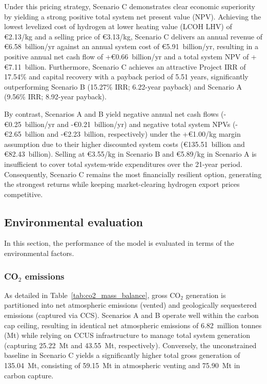 \documentclass[preprint,12pt]{elsarticle}
\begin{document}
Under this pricing strategy, Scenario C demonstrates clear economic superiority by yielding a strong positive total system net present value (NPV). Achieving the lowest levelized cost of hydrogen at lower heating value (LCOH LHV) of €2.13/kg and a selling price of €3.13/kg, Scenario C delivers an annual revenue of €6.58~billion/yr against an annual system cost of €5.91~billion/yr, resulting in a positive annual net cash flow of +€0.66~billion/yr and a total system NPV of +€7.11~billion. Furthermore, Scenario C achieves an attractive Project IRR of 17.54\% and capital recovery with a payback period of 5.51 years, significantly outperforming Scenario B (15.27\% IRR; 6.22-year payback) and Scenario A (9.56\% IRR; 8.92-year payback).

By contrast, Scenarios A and B yield negative annual net cash flows (-€0.25~billion/yr and -€0.21~billion/yr) and negative total system NPVs (-€2.65~billion and -€2.23~billion, respectively) under the +€1.00/kg margin assumption due to their higher discounted system costs (€135.51~billion and €82.43~billion). Selling at €3.55/kg in Scenario B and €5.89/kg in Scenario A is insufficient to cover total system-wide expenditures over the 21-year period. Consequently, Scenario C remains the most financially resilient option, generating the strongest returns while keeping market-clearing hydrogen export prices competitive.


\subsection{Environmental evaluation}
In this section, the performance of the model is evaluated in terms of the environmental factors.

\subsubsection{CO$_2$ emissions}
\label{sec:co2_emis}
As detailed in Table~\ref{tab:co2_mass_balance}, gross $\text{CO}_2$ generation is partitioned into net atmospheric emissions (vented) and geologically sequestered emissions (captured via CCS). Scenarios A and B operate well within the carbon cap ceiling, resulting in identical net atmospheric emissions of 6.82~million tonnes (Mt) while relying on CCUS infrastructure to manage total system generation (capturing 25.22~Mt and 43.55~Mt, respectively). Conversely, the unconstrained baseline in Scenario C yields a significantly higher total gross generation of 135.04~Mt, consisting of 59.15~Mt in atmospheric venting and 75.90~Mt in carbon capture.
\end{document}
